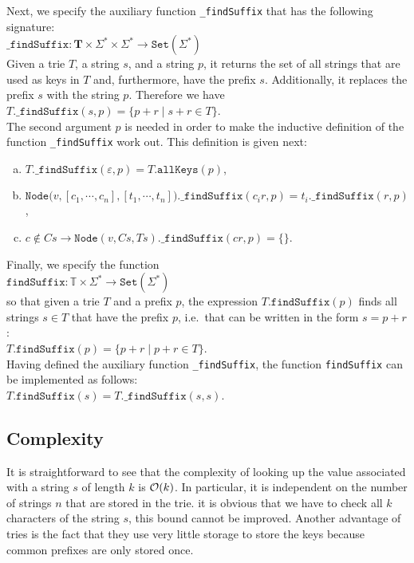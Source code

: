 Next, we specify the auxiliary function \texttt{\_findSuffix} that has the following signature:
\\[0.2cm]
\hspace*{1.3cm}
$\texttt{\_findSuffix}: \mathbf{T} \times \Sigma^* \times \Sigma^* \rightarrow \texttt{Set}(\Sigma^*)$
\\[0.2cm]
Given a trie $T$, a string $s$, and a string $p$, it returns the set of all strings that are used as keys in $T$
and, furthermore, have the prefix $s$.  Additionally, it replaces the prefix $s$ with the string $p$.  Therefore
we have
\\[0.2cm]
\hspace*{1.3cm}
$T.\texttt{\_findSuffix}(s, p) = \bigl\{ p+r \mid s + r \in T \bigr\}$.
\\[0.2cm]
The second argument $p$ is needed in order to make the inductive definition of the function
\texttt{\_findSuffix} work out.  This definition is given next:
\begin{enumerate}[(a)]
\item $T.\texttt{\_findSuffix}(\varepsilon, p) = T.\texttt{allKeys}(p)$,
\item $\texttt{Node}\bigl(v, [c_1, \cdots, c_n], [t_1,\cdots,t_n]\bigr).\texttt{\_findSuffix}(c_ir, p) = 
       t_i.\texttt{\_findSuffix}(r, p) 
      $,
\item $c \not\in C\!s \rightarrow \texttt{Node}(v, C\!s, T\!s).\texttt{\_findSuffix}(cr, p) = \{\}$.
\end{enumerate}
Finally, we specify the function 
\\[0.2cm]
\hspace*{1.3cm}
$\texttt{findSuffix}:\mathbb{T} \times \Sigma^* \rightarrow \texttt{Set}(\Sigma^*)$
\\[0.2cm]
so that given a trie $T$ and a prefix $p$, the expression $T.\texttt{findSuffix}(p)$ finds all
strings $s \in T$ that have the prefix $p$, i.e.~that can be written in the form $s=p+r$:
\\[0.2cm]
\hspace*{1.3cm}
$T.\texttt{findSuffix}(p) = \bigl\{ p+r \mid p+r \in T \bigr\}$.
\\[0.2cm]
Having defined the auxiliary function \texttt{\_findSuffix}, the function \texttt{findSuffix} can be
implemented as follows:
\\[0.2cm]
\hspace*{1.3cm}
$T.\texttt{findSuffix}(s) = T.\texttt{\_findSuffix}(s, s)$.



\subsection{Complexity}
It is straightforward to see that the complexity of looking up the value associated with a string
$s$ of length $k$ is $\mathcal{O}(k)$.  In particular, it is independent on the number of strings $n$ that are stored in
the trie.
it is obvious that we have to check all $k$ characters of the string $s$, this bound cannot be
improved.   Another advantage of tries is the fact that they use very little storage to store the
keys because common prefixes are only stored once. 

